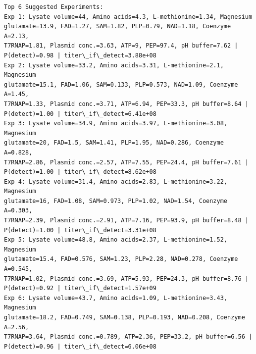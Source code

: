 \documentclass[11pt]{article}
\begin{document}
\begin{Verbatim}[commandchars=\\\{\}]
Top 6 Suggested Experiments:
Exp 1: Lysate volume=44, Amino acids=4.3, L-methionine=1.34, Magnesium
glutamate=13.9, FAD=1.27, SAM=1.82, PLP=0.79, NAD=1.18, Coenzyme A=2.13,
T7RNAP=1.81, Plasmid conc.=3.63, ATP=9, PEP=97.4, pH buffer=7.62 |
P(detect)=0.98 | titer\_if\_detect=3.88e+08
Exp 2: Lysate volume=33.2, Amino acids=3.31, L-methionine=2.1, Magnesium
glutamate=15.1, FAD=1.06, SAM=0.133, PLP=0.573, NAD=1.09, Coenzyme A=1.45,
T7RNAP=1.33, Plasmid conc.=3.71, ATP=6.94, PEP=33.3, pH buffer=8.64 |
P(detect)=1.00 | titer\_if\_detect=6.41e+08
Exp 3: Lysate volume=34.9, Amino acids=3.97, L-methionine=3.08, Magnesium
glutamate=20, FAD=1.5, SAM=1.41, PLP=1.95, NAD=0.286, Coenzyme A=0.828,
T7RNAP=2.86, Plasmid conc.=2.57, ATP=7.55, PEP=24.4, pH buffer=7.61 |
P(detect)=1.00 | titer\_if\_detect=8.62e+08
Exp 4: Lysate volume=31.4, Amino acids=2.83, L-methionine=3.22, Magnesium
glutamate=16, FAD=1.08, SAM=0.973, PLP=1.02, NAD=1.54, Coenzyme A=0.303,
T7RNAP=2.39, Plasmid conc.=2.91, ATP=7.16, PEP=93.9, pH buffer=8.48 |
P(detect)=1.00 | titer\_if\_detect=3.31e+08
Exp 5: Lysate volume=48.8, Amino acids=2.37, L-methionine=1.52, Magnesium
glutamate=15.4, FAD=0.576, SAM=1.23, PLP=2.28, NAD=0.278, Coenzyme A=0.545,
T7RNAP=1.02, Plasmid conc.=3.69, ATP=5.93, PEP=24.3, pH buffer=8.76 |
P(detect)=0.92 | titer\_if\_detect=1.57e+09
Exp 6: Lysate volume=43.7, Amino acids=1.09, L-methionine=3.43, Magnesium
glutamate=18.2, FAD=0.749, SAM=0.138, PLP=0.193, NAD=0.208, Coenzyme A=2.56,
T7RNAP=3.64, Plasmid conc.=0.789, ATP=2.36, PEP=33.2, pH buffer=6.56 |
P(detect)=0.96 | titer\_if\_detect=6.06e+08
    \end{Verbatim}

    \begin{center}
    \end{center}
    { \hspace*{\fill} \\}
    
    \begin{center}
    \end{center}
    { \hspace*{\fill} \\}
    
    \begin{center}
    \end{center}
    { \hspace*{\fill} \\}
    
\end{document}
